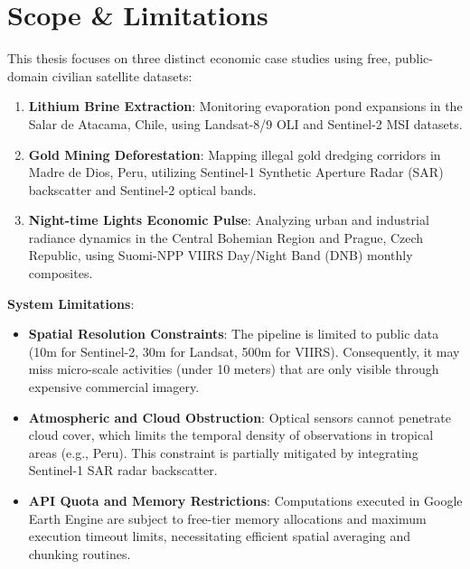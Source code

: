 \section{Scope \& Limitations}
This thesis focuses on three distinct economic case studies using free, public-domain civilian satellite datasets:
\begin{enumerate}
  \item \textbf{Lithium Brine Extraction}: Monitoring evaporation pond expansions in the Salar de Atacama, Chile, using Landsat-8/9 OLI and Sentinel-2 MSI datasets.
  \item \textbf{Gold Mining Deforestation}: Mapping illegal gold dredging corridors in Madre de Dios, Peru, utilizing Sentinel-1 Synthetic Aperture Radar (SAR) backscatter and Sentinel-2 optical bands.
  \item \textbf{Night-time Lights Economic Pulse}: Analyzing urban and industrial radiance dynamics in the Central Bohemian Region and Prague, Czech Republic, using Suomi-NPP VIIRS Day/Night Band (DNB) monthly composites.

\end{enumerate}
\textbf{System Limitations}:
\begin{itemize}
  \item \textbf{Spatial Resolution Constraints}: The pipeline is limited to public data (10m for Sentinel-2, 30m for Landsat, 500m for VIIRS). Consequently, it may miss micro-scale activities (under 10 meters) that are only visible through expensive commercial imagery.
  \item \textbf{Atmospheric and Cloud Obstruction}: Optical sensors cannot penetrate cloud cover, which limits the temporal density of observations in tropical areas (e.g., Peru). This constraint is partially mitigated by integrating Sentinel-1 SAR radar backscatter.
  \item \textbf{API Quota and Memory Restrictions}: Computations executed in Google Earth Engine are subject to free-tier memory allocations and maximum execution timeout limits, necessitating efficient spatial averaging and chunking routines.

\end{itemize}
